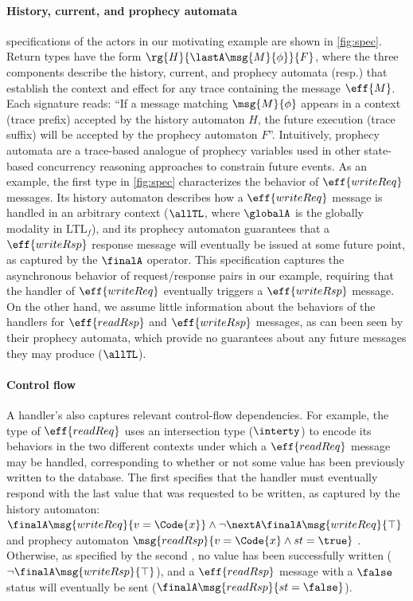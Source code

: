 \paragraph{History, current, and prophecy automata} \PAT{} specifications
of the actors in our motivating example are shown in
\autoref{fig:spec}. Return types have the form
$\rg{H}{\lastA\msg{M}{\phi}}{F}$, where the three components describe
the history, current, and prophecy automata (resp.) that establish the
context and effect for any trace containing the message $\eff{M}$.
Each signature reads: ``If a message matching $\msg{M}{\phi}$ appears
in a context (trace prefix) accepted by the history automaton $H$, the
future execution (trace suffix) will be accepted by the prophecy
automaton $F$''. Intuitively, prophecy automata are a trace-based
analogue of prophecy variables\cite{LM22} used in other
state-based concurrency reasoning approaches to constrain future
events. As an example, the first type in \autoref{fig:spec}
characterizes the behavior of $\eff{writeReq}$ messages. Its history
automaton describes how a $\eff{writeReq}$ message is handled in an
arbitrary context ($\allTL$, where $\globalA$ is the globally modality
in LTL$_f$), and its prophecy automaton guarantees that a
$\eff{writeRsp}$ response message will eventually be issued at some
future point, as captured by the $\finalA$ operator.  This
specification captures the asynchronous behavior of request/response
pairs in our example, requiring that the handler of $\eff{writeReq}$
eventually triggers a $\eff{writeRsp}$ message. On the other hand, we
assume little information about the behaviors of the handlers for
$\eff{readRsp}$ and $\eff{writeRsp}$ messages, as can been seen by
their prophecy automata, which provide no guarantees about any future
messages they may produce ($\allTL$).

\paragraph{Control flow} A handler's \PAT{} also captures  relevant
control-flow dependencies. For example, the type of $\eff{readReq}$
uses an intersection type ($\interty$) to encode its behaviors in the
two different contexts under which a $\eff{readReq}$ message may be
handled, corresponding to whether or not some value has been
previously written to the database. The first \PAT{} specifies that
the handler must eventually respond with the last value that was
requested to be written, as captured by the history automaton: %
{
  $ \finalA \msg{writeReq}{v = \Code{x}} \land
  \neg\nextA\finalA\msg{writeReq}{\top} $ } %
and prophecy automaton %
{ $\msg{readRsp}{v = \Code{x} \land st = \true}$ }.
Otherwise, as specified by the second \PAT{}, no value has been
successfully written ($\neg\finalA \msg{writeRsp}{\top}$), and a
$\eff{readRsp}$ message with a $\false$ status will eventually be sent
($\finalA\msg{readRsp}{st = \false}$).

